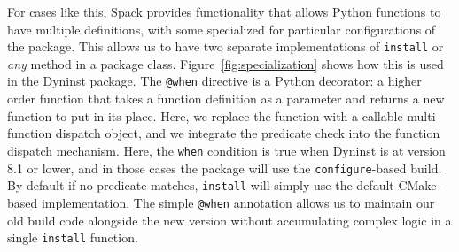 For cases like this, Spack provides functionality that allows Python functions to have
multiple definitions, with some specialized for particular configurations of the package.
This allows us to have two separate implementations of {\tt install} or {\it any} method 
in a package class. Figure~\ref{fig:specialization} shows how this is used in the Dyninst
package.  The {\tt @when} directive is a Python decorator: a higher order function that 
takes a function definition as a parameter and returns a new function to put in its place.
Here, we replace the function with a callable multi-function dispatch object, and we 
integrate the predicate check into the function dispatch mechanism.  Here, the
{\tt when} condition is true when Dyninst is at version 8.1 or lower, and in those cases
the package will use the {\tt configure}-based build.  By default if no predicate matches,
{\tt install} will simply use the default CMake-based implementation. The simple {\tt @when}
annotation allows us to maintain our old build code alongside the new version without 
accumulating complex logic in a single {\tt install} function.





















